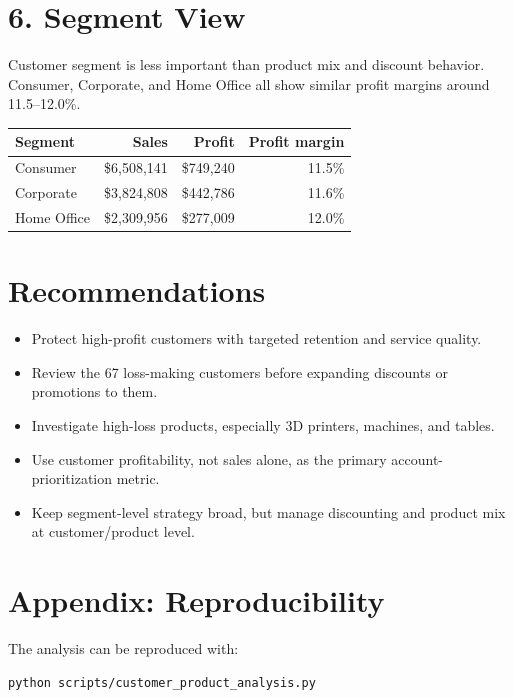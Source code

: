 \documentclass[11pt,a4paper]{article}
\begin{document}
\section{6. Segment View}

Customer segment is less important than product mix and discount behavior.
Consumer, Corporate, and Home Office all show similar profit margins around 11.5--12.0\%.

\begin{tabularx}{\textwidth}{lrrr}
    \toprule
    Segment & Sales & Profit & Profit margin \\
    \midrule
    Consumer & \$6,508,141 & \$749,240 & 11.5\% \\
    Corporate & \$3,824,808 & \$442,786 & 11.6\% \\
    Home Office & \$2,309,956 & \$277,009 & 12.0\% \\
    \bottomrule
\end{tabularx}

\section{Recommendations}

\begin{itemize}
    \item Protect high-profit customers with targeted retention and service quality.
    \item Review the 67 loss-making customers before expanding discounts or promotions to them.
    \item Investigate high-loss products, especially 3D printers, machines, and tables.
    \item Use customer profitability, not sales alone, as the primary account-prioritization metric.
    \item Keep segment-level strategy broad, but manage discounting and product mix at customer/product level.
\end{itemize}

\section{Appendix: Reproducibility}

The analysis can be reproduced with:

\begin{verbatim}
python scripts/customer_product_analysis.py
\end{verbatim}
\end{document}

